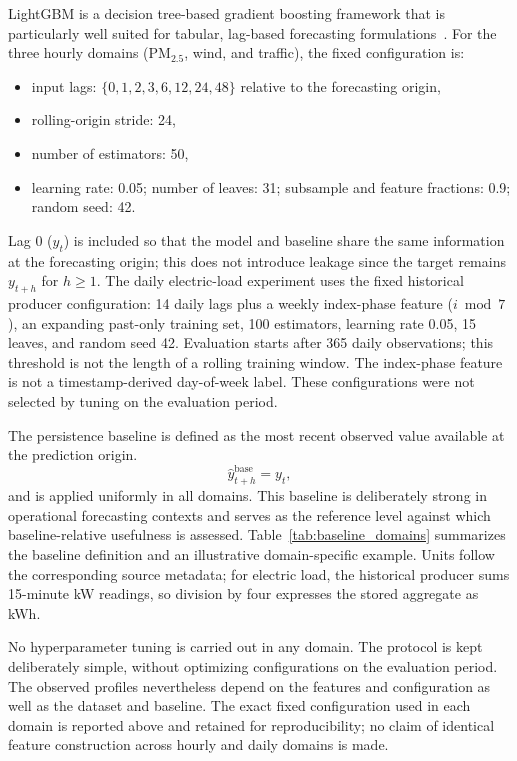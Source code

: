\documentclass[pdflatex]{sn-jnl}
\begin{document}
LightGBM is a decision tree-based gradient boosting framework that is
particularly well suited for tabular, lag-based forecasting
formulations~\citep{ke2017lightgbm}. For the three hourly domains
(PM$_{2.5}$, wind, and traffic), the fixed configuration is:
\begin{itemize}
  \item input lags: $\{0,1,2,3,6,12,24,48\}$ relative to the forecasting origin,
  \item rolling-origin stride: 24,
  \item number of estimators: 50,
  \item learning rate: 0.05; number of leaves: 31; subsample and feature
  fractions: 0.9; random seed: 42.
\end{itemize}
Lag 0 ($y_t$) is included so that the model and baseline share the same
information at the forecasting origin; this does not introduce leakage
since the target remains $y_{t+h}$ for $h \geq 1$.
The daily electric-load experiment uses the fixed historical producer
configuration: 14 daily lags plus a weekly index-phase feature ($i\bmod7$),
an expanding past-only training set, 100 estimators, learning rate 0.05,
15 leaves, and random seed 42. Evaluation starts after 365 daily
observations; this threshold is not the length of a rolling training window.
The index-phase feature is not a timestamp-derived day-of-week label.
These configurations were not selected by tuning on the evaluation period.

The persistence baseline is defined as the most recent observed value
available at the prediction origin.
\begin{equation}
\hat{y}^{\mathrm{base}}_{t+h} = y_t,
\end{equation}
and is applied uniformly in all domains. This baseline is deliberately
strong in operational forecasting contexts and serves as the reference
level against which baseline-relative usefulness is assessed.
Table~\ref{tab:baseline_domains} summarizes the baseline definition and an
illustrative domain-specific example. Units follow the corresponding source
metadata; for electric load, the historical producer sums 15-minute kW
readings, so division by four expresses the stored aggregate as kWh.



No hyperparameter tuning is carried out in any domain. The protocol is
kept deliberately simple, without optimizing configurations on the
evaluation period. The observed profiles nevertheless depend on the
features and configuration as well as the dataset and baseline. The exact fixed configuration used in each domain is reported
above and retained for reproducibility; no claim of identical feature
construction across hourly and daily domains is made.
\end{document}
